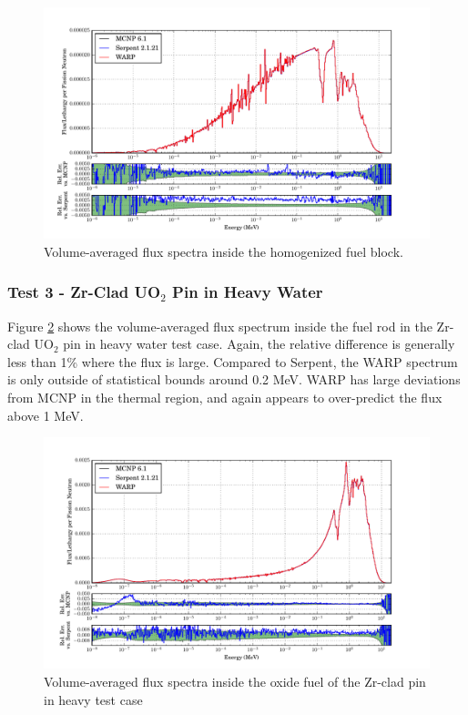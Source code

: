 \documentclass[preprint,12pt]{elsarticle}
\begin{document}
\begin{figure}[h!]
\centering
\includegraphics[width=\textwidth,trim= 1cm 0cm 1cm 0cm]{graphics/homfuel_spec.pdf}
\caption{Volume-averaged flux spectra inside the homogenized fuel block. \label{homfuel_spec} }
\end{figure}

\newpage
\subsubsection{Test 3 - Zr-Clad UO$_2$ Pin in Heavy Water}

Figure \ref{pincell_spec} shows the volume-averaged flux spectrum inside the fuel rod in the Zr-clad UO$_2$ pin in heavy water test case.  Again, the relative difference is generally less than 1\% where the flux is large.  Compared to Serpent, the WARP spectrum is only outside of statistical bounds around 0.2 MeV.   WARP has large deviations from MCNP in the thermal region, and again appears to over-predict the flux above 1 MeV.

\begin{figure}[h!]
\centering
\includegraphics[width=\textwidth,trim= 1cm 0cm 1cm 0cm]{graphics/pincell_spec.pdf}
\caption{Volume-averaged flux spectra inside the oxide fuel of the Zr-clad pin in heavy test case \label{pincell_spec} }
\end{figure}
\end{document}
